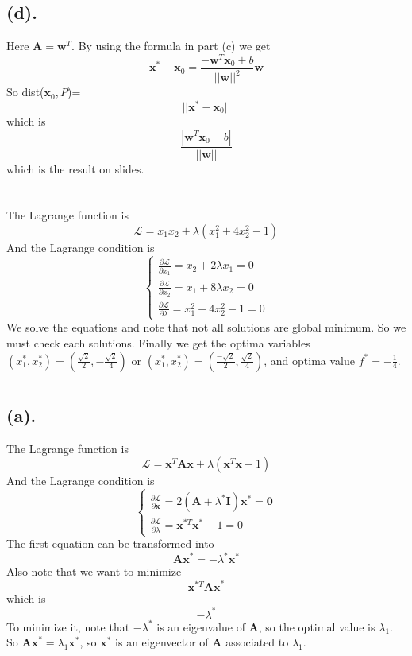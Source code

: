 \documentclass[12pt,letterpaper]{article}
\begin{document}
\subsection*{(d).}
Here $\boldsymbol{A}=\boldsymbol{w}^T$. By using the formula in part (c) we get $$\boldsymbol{x}^*-\boldsymbol{x}_0=\frac{-\boldsymbol{w}^T\boldsymbol{x}_0+b}{||\boldsymbol{w}||^2}\boldsymbol{w}$$
So dist($\boldsymbol{x}_0,P$)=$$||\boldsymbol{x}^*-\boldsymbol{x}_0||$$
which is $$\frac{|\boldsymbol{w}^T\boldsymbol{x}_0-b|}{||\boldsymbol{w}||}$$
which is the result on slides.
\section{}
The Lagrange function is
$$\mathcal{L}=x_1x_2+\lambda(x_1^2+4x_2^2-1)$$
And the Lagrange condition is 
$$\begin{cases}
\frac{\partial\mathcal{L}}{\partial x_1}=x_2+2\lambda x_1=0\\
\frac{\partial\mathcal{L}}{\partial x_2}=x_1+8\lambda x_2=0\\
\frac{\partial\mathcal{L}}{\partial \lambda}=x_1^2+4x_2^2-1=0
\end{cases}$$
We solve the equations and note that not all solutions are global minimum. So we must check each solutions. Finally we get the optima variables 
$(x_1^*,x_2^*)=(\frac{\sqrt{2}}{2},-\frac{\sqrt{2}}{4})$ or $(x_1^*,x_2^*)=(\frac{-\sqrt{2}}{2},\frac{\sqrt{2}}{4})$, and optima value $f^*=-\frac{1}{4}$.
\section{}
\subsection*{(a).}
The Lagrange function is
$$\mathcal{L}=\boldsymbol{x}^T\boldsymbol{Ax}+\lambda(\boldsymbol{x}^T\boldsymbol{x}-1)$$
And the Lagrange condition is 
$$\begin{cases}
\frac{\partial\mathcal{L}}{\partial \boldsymbol{x}}=2(\boldsymbol{A}+\lambda^*\boldsymbol{I})\boldsymbol{x^*}=\boldsymbol{0}\\
\frac{\partial\mathcal{L}}{\partial\lambda}=\boldsymbol{x}^{*T}\boldsymbol{x}^*-1=0
\end{cases}$$
The first equation can be transformed into
$$\boldsymbol{Ax}^*=-\lambda^*\boldsymbol{x}^*$$
Also note that we want to minimize 
$$\boldsymbol{x}^{*T}\boldsymbol{Ax}^*$$
which is
$$-\lambda^*$$
To minimize it, note that $-\lambda^*$ is an eigenvalue of $\boldsymbol{A}$, so the optimal value is $\lambda_1$. So $\boldsymbol{Ax}^*=\lambda_1\boldsymbol{x}^*$, so $\boldsymbol{x}^*$ is an eigenvector of $\boldsymbol{A}$ associated to $\lambda_1$.
\end{document}
